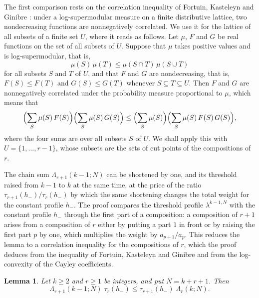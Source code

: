 \documentclass{amsart}
\newtheorem{lemma}[theorem]{Lemma}
\theoremstyle{definition}
\theoremstyle{remark}
\numberwithin{equation}{section}
\begin{document}
The first comparison rests on the correlation inequality of Fortuin, Kasteleyn and Ginibre \cite[Proposition~1]{fortuin1971}: under a log-supermodular measure on a finite distributive lattice, two nondecreasing functions are nonnegatively correlated. We use it for the lattice of all subsets of a finite set $U$, where it reads as follows. Let $\mu$, $F$ and $G$ be real functions on the set of all subsets of $U$. Suppose that $\mu$ takes positive values and is log-supermodular, that is,
\[
\mu(S)\,\mu(T)\le\mu(S\cap T)\,\mu(S\cup T)
\]
for all subsets $S$ and $T$ of $U$, and that $F$ and $G$ are nondecreasing, that is, $F(S)\le F(T)$ and $G(S)\le G(T)$ whenever $S\subseteq T\subseteq U$. Then $F$ and $G$ are nonnegatively correlated under the probability measure proportional to $\mu$, which means that
\[
\Bigl(\sum_{S}\mu(S)\,F(S)\Bigr)\Bigl(\sum_{S}\mu(S)\,G(S)\Bigr)\le\Bigl(\sum_{S}\mu(S)\Bigr)\Bigl(\sum_{S}\mu(S)\,F(S)\,G(S)\Bigr),
\]
where the four sums are over all subsets $S$ of $U$. We shall apply this with $U=\{1,\dots,r-1\}$, whose subsets are the sets of cut points of the compositions of $r$.

The chain sum $\Lambda_{r+1}(k-1;N)$ can be shortened by one, and its threshold raised from $k-1$ to $k$ at the same time, at the price of the ratio $\tau_{r+1}(h_-)/\tau_r(h_-)$ by which the same shortening changes the total weight for the constant profile $h_-$. The proof compares the threshold profile $\lambda^{k-1,N}$ with the constant profile $h_-$ through the first part of a composition: a composition of $r+1$ arises from a composition of $r$ either by putting a part $1$ in front or by raising the first part $p$ by one, which multiplies the weight by $a_{p+1}/a_p$. This reduces the lemma to a correlation inequality for the compositions of $r$, which the proof deduces from the inequality of Fortuin, Kasteleyn and Ginibre and from the log-convexity of the Cayley coefficients.

\begin{lemma}\label{lem:firstcell}
Let $k\ge 2$ and $r\ge 1$ be integers, and put $N=k+r+1$. Then
\[
\Lambda_{r+1}(k-1;N)\;\tau_r(h_-)\le\tau_{r+1}(h_-)\;\Lambda_r(k;N).
\]
\end{lemma}
\end{document}
